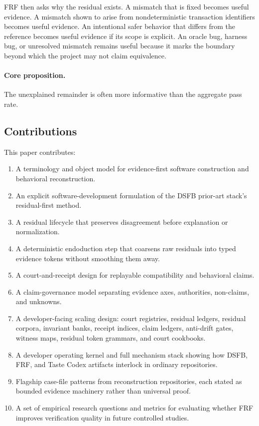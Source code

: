 \documentclass[11pt,a4paper]{article}
\newcommand{\frf}{\textsc{FRF}}
\newcommand{\dsfb}{\textsc{DSFB}}
\begin{document}
\frf{} then asks why the residual exists. A mismatch that is fixed becomes useful evidence. A mismatch shown to arise from nondeterministic transaction identifiers becomes useful evidence. An intentional safer behavior that differs from the reference becomes useful evidence if its scope is explicit. An oracle bug, harness bug, or unresolved mismatch remains useful because it marks the boundary beyond which the project may not claim equivalence.

\paragraph{Core proposition.}
The unexplained remainder is often more informative than the aggregate pass rate.

\subsection{Contributions}
This paper contributes:
\begin{enumerate}
\item A terminology and object model for evidence-first software construction and behavioral reconstruction.
\item An explicit software-development formulation of the \dsfb{} prior-art stack's residual-first method.
\item A residual lifecycle that preserves disagreement before explanation or normalization.
\item A deterministic endoduction step that coarsens raw residuals into typed evidence tokens without smoothing them away.
\item A court-and-receipt design for replayable compatibility and behavioral claims.
\item A claim-governance model separating evidence axes, authorities, non-claims, and unknowns.
\item A developer-facing scaling design: court registries, residual ledgers, residual corpora, invariant banks, receipt indices, claim ledgers, anti-drift gates, witness maps, residual token grammars, and court cookbooks.
\item A developer operating kernel and full mechanism stack showing how \dsfb{}, \frf{}, and Taste Codex artifacts interlock in ordinary repositories.
\item Flagship case-file patterns from reconstruction repositories, each stated as bounded evidence machinery rather than universal proof.
\item A set of empirical research questions and metrics for evaluating whether \frf{} improves verification quality in future controlled studies.
\end{enumerate}
\end{document}
